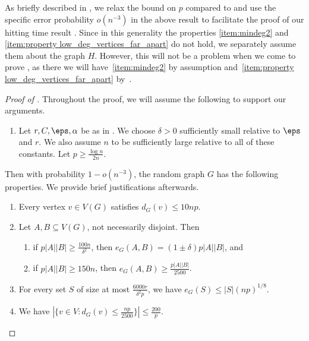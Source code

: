 \documentclass[10pt,a4paper,reqno]{amsart}
\begin{document}
As briefly described in , we relax the bound on $p$ compared to  and use the specific error probability $o(n^{-3})$ in the above result to facilitate the proof of our hitting time result . Since in this generality the properties \ref{item:mindeg2} and \ref{item:property low_deg_vertices_far_apart} do not hold, we separately assume them about the graph $H$. However, this will not be a problem when we come to prove , as there we will have~\ref{item:mindeg2} by assumption and~\ref{item:property low_deg_vertices_far_apart} \whp by~.

\begin{proof}[Proof of ]
Throughout the proof, we will assume the following to support our arguments. 
\begin{enumerate}[leftmargin=*,label = {\bfseries P0}]
\item Let $r, C, \eps, \alpha$ be as in . We choose $\delta >0$ sufficiently small relative to $\eps$ and $r$. We also assume $n$ to be sufficiently large relative to all of these constants. Let $p \ge \frac{\log n}{2n}$. 
\label{item:parameter hierarchy}
\end{enumerate}
Then with probability $1-o(n^{-3})$, the random graph $G$ has the following properties. We provide brief justifications afterwards.
\begin{enumerate}[leftmargin=*,label = {\bfseries P\arabic{enumi}}]
\item Every vertex $v\in V(G)$ satisfies $d_G(v) \le 10np$. \label{item:property 1}
\item Let $A,B\subseteq V(G)$, not necessarily disjoint. Then \label{item:property 2 both}
    \begin{enumerate} 
    \item if $p|A||B|\ge \frac{100n}{\delta^2}$, then $e_G(A,B) = (1 \pm \delta)p|A||B|$, and
    \label{item:property 2}
    \item if $p|A||B|\ge 150n$, then $e_G(A,B) \ge \frac{p|A||B|}{2500}$.
    \label{item:property 2 alt version}
    \end{enumerate}
    \item For every set $S$ of size at most $\frac{6000r}{\delta^2 p}$, we have $e_G(S)\le |S|(np)^{1/8}$.
    \label{item:property 3}
    \item We have $|\{v \in V: d_G(v) \le \frac{np}{2500}\}|\le \frac{200}{p}$.
    \label{item:property 4}

\end{enumerate}
\end{proof}
\end{document}
